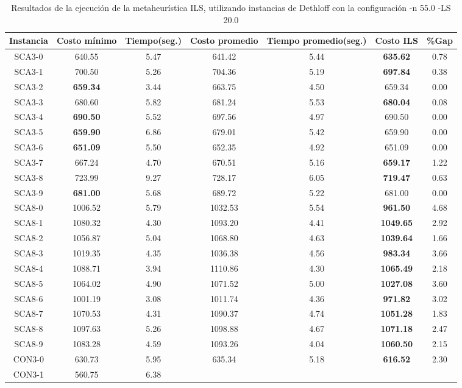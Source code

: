 \begin{table}[ht]
\caption{Resultados de la ejecución de la metaheurística ILS, utilizando instancias de Dethloff con la configuración -n 55.0 -LS 20.0}
\centering
\small
\begin{tabular}{c c c c c c c}
\hline\hline
Instancia & Costo mínimo & Tiempo(seg.) & Costo promedio & Tiempo promedio(seg.) & Costo ILS & \%Gap \\ [0.5ex]
\hline
SCA3-0 & 640.55 & 5.47 & 
641.42 & 5.44 & \bf{635.62} & 
0.78\\SCA3-1 & 700.50 & 5.26 & 
704.36 & 5.19 & \bf{697.84} & 
0.38\\SCA3-2 & \bf{659.34} & 3.44 & 
663.75 & 4.50 & 659.34 & 0.00\\
SCA3-3 & 680.60 & 5.82 & 
681.24 & 5.53 & \bf{680.04} & 
0.08\\SCA3-4 & \bf{690.50} & 5.52 & 
697.56 & 4.97 & 690.50 & 0.00\\
SCA3-5 & \bf{659.90} & 6.86 & 
679.01 & 5.42 & 659.90 & 0.00\\
SCA3-6 & \bf{651.09} & 5.50 & 
652.35 & 4.92 & 651.09 & 0.00\\
SCA3-7 & 667.24 & 4.70 & 
670.51 & 5.16 & \bf{659.17} & 
1.22\\SCA3-8 & 723.99 & 9.27 & 
728.17 & 6.05 & \bf{719.47} & 
0.63\\SCA3-9 & \bf{681.00} & 5.68 & 
689.72 & 5.22 & 681.00 & 0.00\\
SCA8-0 & 1006.52 & 5.79 & 
1032.53 & 5.54 & \bf{961.50} & 
4.68\\SCA8-1 & 1080.32 & 4.30 & 
1093.20 & 4.41 & \bf{1049.65} & 
2.92\\SCA8-2 & 1056.87 & 5.04 & 
1068.80 & 4.63 & \bf{1039.64} & 
1.66\\SCA8-3 & 1019.35 & 4.35 & 
1036.38 & 4.56 & \bf{983.34} & 
3.66\\SCA8-4 & 1088.71 & 3.94 & 
1110.86 & 4.30 & \bf{1065.49} & 
2.18\\SCA8-5 & 1064.02 & 4.90 & 
1071.52 & 5.00 & \bf{1027.08} & 
3.60\\SCA8-6 & 1001.19 & 3.08 & 
1011.74 & 4.36 & \bf{971.82} & 
3.02\\SCA8-7 & 1070.53 & 4.31 & 
1090.37 & 4.74 & \bf{1051.28} & 
1.83\\SCA8-8 & 1097.63 & 5.26 & 
1098.88 & 4.67 & \bf{1071.18} & 
2.47\\SCA8-9 & 1083.28 & 4.59 & 
1093.26 & 4.04 & \bf{1060.50} & 
2.15\\CON3-0 & 630.73 & 5.95 & 
635.34 & 5.18 & \bf{616.52} & 
2.30\\CON3-1 & 560.75 & 6.38 & 

\end{tabular}
\end{table}
